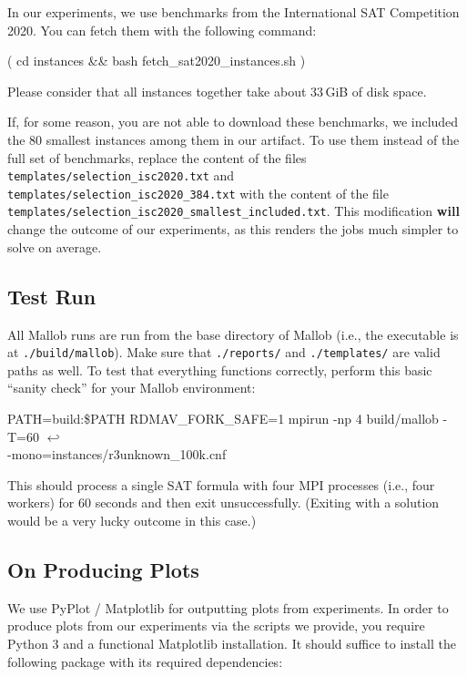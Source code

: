 \documentclass[runningheads]{article}
\newcommand{\CR}{{\tiny$\hookleftarrow$}}
\numberwithin{dummy}{subsection}
\begin{document}
In our experiments, we use benchmarks from the International SAT Competition 2020.
You can fetch them with the following command:
\begin{ttfenv}
( cd instances \&\& bash fetch\_sat2020\_instances.sh )
\end{ttfenv}
Please consider that all instances together take about 33$\,$GiB of disk space.

If, for some reason, you are not able to download these benchmarks, we included the 80 smallest instances among them in our artifact.
To use them instead of the full set of benchmarks, replace the content of the files \texttt{templates/selection\_isc2020.txt} and \texttt{templates/selection\_isc2020\_384.txt} with the content of the file \texttt{templates/selection\_isc2020\_smallest\_included.txt}.
This modification \textbf{will} change the outcome of our experiments, as this renders the jobs much simpler to solve on average.

\subsection{Test Run}

All Mallob runs are run from the base directory of Mallob (i.e., the executable is at \texttt{./build/mallob}).
Make sure that \texttt{./reports/} and \texttt{./templates/} are valid paths as well.
To test that everything functions correctly, perform this basic ``sanity check'' for your Mallob environment:

\begin{ttfenv}
PATH=build:\$PATH RDMAV\_FORK\_SAFE=1 mpirun -np 4 build/mallob -T=60 \CR\\
-mono=instances/r3unknown\_100k.cnf
\end{ttfenv}

This should process a single SAT formula with four MPI processes (i.e., four workers) for 60 seconds and then exit unsuccessfully. (Exiting with a solution would be a very lucky outcome in this case.)

\subsection{On Producing Plots}
\label{sec:plots}

We use PyPlot / Matplotlib for outputting plots from experiments.
In order to produce plots from our experiments via the scripts we provide, you require Python 3 and a functional Matplotlib installation.
It should suffice to install the following package with its required dependencies:
\end{document}
